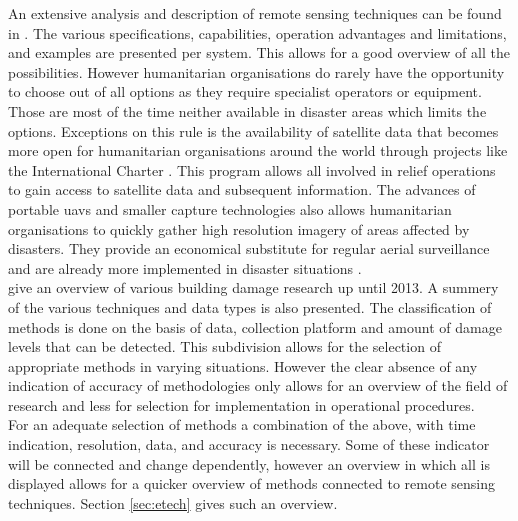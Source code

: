 An extensive analysis and description of remote sensing techniques can be found in \citet{Kerle2008}. The various specifications, capabilities, operation advantages and limitations, and examples are presented per system. This allows for a good overview of all the possibilities. However humanitarian organisations do rarely have the opportunity to choose out of all options as they require specialist operators or equipment. Those are most of the time neither available in disaster areas which limits the options. Exceptions on this rule is the availability of satellite data that becomes more open for humanitarian organisations around the world through projects like the International Charter \citep{Voigt2016}. This program allows all involved in relief operations to gain access to satellite data and subsequent information. The advances of portable \ac{uav}s and smaller capture technologies also allows humanitarian organisations to quickly gather high resolution imagery of areas affected by disasters. They provide an economical  substitute for regular aerial surveillance \citep{Nex2014} and are already more implemented in disaster situations \citep{Lieshout2017,Johnson2017}.\\

\citet{Dong2013} give an overview of various building damage research up until 2013. A summery of the various techniques and data types is also presented. The classification of methods is done on the basis of data, collection platform and amount of damage levels that can be detected. This subdivision allows for the selection of appropriate methods in varying situations. However the clear absence of any indication of accuracy of methodologies only allows for an overview of the field of research and less for selection for implementation in operational procedures. \\

For an adequate selection of methods a combination of the above, with time indication, resolution, data, and accuracy is necessary. Some of these indicator will be connected and change dependently, however an overview in which all is displayed allows for a quicker overview of methods connected to remote sensing techniques. Section \ref{sec:etech} gives such an overview.\\

